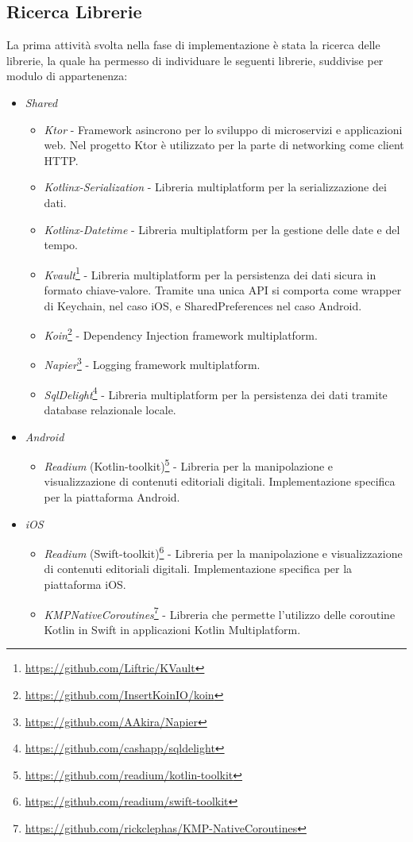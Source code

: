 \subsection{Ricerca Librerie}
La prima attività svolta nella fase di implementazione è stata la ricerca delle librerie, la quale ha permesso di individuare le seguenti librerie, suddivise per modulo di appartenenza:
\begin{itemize}
    \item \textit{Shared}
    \begin{itemize}
        \item \textit{Ktor} - Framework asincrono per lo sviluppo di microservizi e applicazioni web. Nel progetto Ktor è utilizzato per la parte di networking come client HTTP.
        \item \textit{Kotlinx-Serialization} - Libreria multiplatform per la serializzazione dei dati.
        \item \textit{Kotlinx-Datetime} - Libreria multiplatform per la gestione delle date e del tempo.
        \item \textit{Kvault}\footnote{\url{https://github.com/Liftric/KVault}} - Libreria multiplatform per la persistenza dei dati sicura in formato chiave-valore. Tramite una unica API si comporta come wrapper di Keychain, nel caso iOS, e SharedPreferences nel caso Android.
        \item \textit{Koin}\footnote{\url{https://github.com/InsertKoinIO/koin}} - Dependency Injection framework multiplatform.
        \item \textit{Napier}\footnote{\url{https://github.com/AAkira/Napier}} - Logging framework multiplatform.
        \item \textit{SqlDelight}\footnote{\url{https://github.com/cashapp/sqldelight}} - Libreria multiplatform per la persistenza dei dati tramite database relazionale locale.
    \end{itemize}
    \item \textit{Android}
    \begin{itemize}
    \item \textit{Readium} (Kotlin-toolkit)\footnote{\url{https://github.com/readium/kotlin-toolkit}} - Libreria per la manipolazione e visualizzazione di contenuti editoriali digitali. Implementazione specifica per la piattaforma Android. 
    \end{itemize}
    \item \textit{iOS}
    \begin{itemize}
    \item \textit{Readium} (Swift-toolkit)\footnote{\url{https://github.com/readium/swift-toolkit}} - Libreria per la manipolazione e visualizzazione di contenuti editoriali digitali. Implementazione specifica per la piattaforma iOS. 
    \item \textit{KMPNativeCoroutines}\footnote{\url{https://github.com/rickclephas/KMP-NativeCoroutines}} - Libreria che permette l'utilizzo delle coroutine Kotlin in Swift in applicazioni Kotlin Multiplatform.
    \end{itemize}
\end{itemize}
